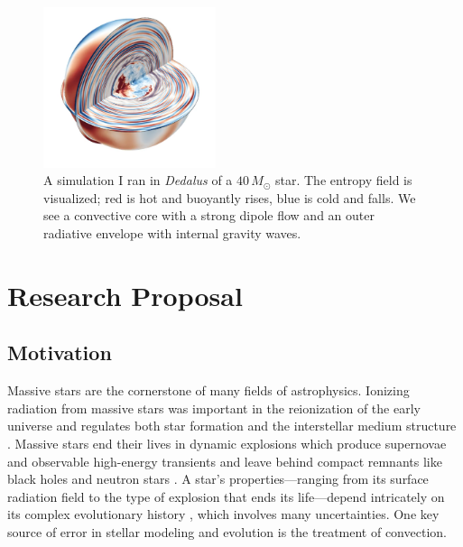 \documentclass[12pt]{article} %
\begin{document}
\begin{figure}
  \begin{center}
      \vspace{-3cm}
    \includegraphics[width=0.45\textwidth]{dedalus_massive_star.png}
      \vspace{-0.8cm}
  \end{center}
    \caption{A simulation I ran in \emph{Dedalus} of a {$40 \,M_{\odot}$} star. 
    The entropy field is visualized; red is hot and buoyantly rises, blue is cold and falls. 
    We see a convective core with a strong dipole flow and an outer radiative envelope with internal gravity waves. \label{fig:star}}
    \vspace{0.0cm}
\end{figure}

\section{Research Proposal} \vspace{-0.2cm}

\subsection{Motivation} \vspace{-0.15cm}

Massive stars are the cornerstone of many fields of astrophysics.
Ionizing radiation from massive stars was important in the reionization of the early universe \citep{bromm_larson_2004} and regulates both star formation and the interstellar medium structure \citep{lancaster_etal_2021}.
Massive stars end their lives in dynamic explosions which produce supernovae and observable high-energy transients \citep{heger_2003} and leave behind compact remnants like black holes and neutron stars \citep{abbott_etal_2018}.
A star's properties---ranging from its surface radiation field to the type of explosion that ends its life---depend intricately on its complex evolutionary history \citep{farmer_etal_2016}, which involves many uncertainties.
One key source of error in stellar modeling and evolution is the treatment of convection.
\end{document}
